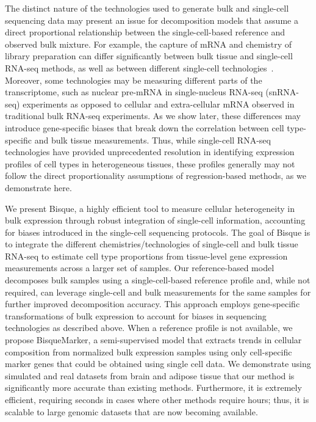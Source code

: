 The distinct nature of the technologies used to generate bulk and single-cell sequencing data may present an issue for decomposition models that assume a direct proportional relationship between the single-cell-based reference and observed bulk mixture. For example, the capture of mRNA and chemistry of library preparation can differ significantly between bulk tissue and single-cell RNA-seq methods, as well as between different single-cell technologies~\cite{Ziegenhain2017-ss,La_Manno2018-tx}. Moreover, some technologies may be measuring different parts of the transcriptome, such as nuclear pre-mRNA in single-nucleus RNA-seq (snRNA-seq) experiments as opposed to cellular and extra-cellular mRNA observed in traditional bulk RNA-seq experiments. As we show later, these differences may introduce gene-specific biases that break down the correlation between cell type-specific and bulk tissue measurements. Thus, while single-cell RNA-seq technologies have provided unprecedented resolution in identifying expression profiles of cell types in heterogeneous tissues, these profiles generally may not follow the direct proportionality assumptions of regression-based methods, as we demonstrate here.

We present Bisque, a highly efficient tool to measure cellular heterogeneity in bulk expression through robust integration of single-cell information, accounting for biases introduced in the single-cell sequencing protocols. The goal of Bisque is to integrate the different chemistries/technologies of single-cell and bulk tissue RNA-seq to estimate cell type proportions from tissue-level gene expression measurements across a larger set of samples. Our reference-based model decomposes bulk samples using a single-cell-based reference profile and, while not required, can leverage single-cell and bulk measurements for the same samples for further improved decomposition accuracy. This approach employs gene-specific transformations of bulk expression to account for biases  in sequencing technologies as described above. When a reference profile is not available, we propose BisqueMarker, a semi-supervised model that extracts trends in cellular composition from normalized bulk expression samples using only cell-specific marker genes that could be obtained using single cell data. We demonstrate using simulated and real datasets from brain and adipose tissue that our method is significantly more accurate than existing methods. Furthermore, it is extremely efficient, requiring seconds in cases where other methods require hours; thus, it is scalable to large genomic datasets that are now becoming available.

